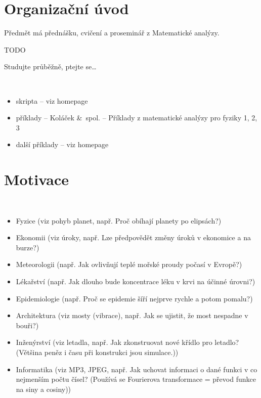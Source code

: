 \documentclass[12pt]{article}					%
\begin{document}
	
\section*{Organizační úvod}
    \begin{poznamka}
        Předmět má přednášku, cvičení a proseminář z Matematické analýzy.
    \end{poznamka}


    \begin{poznamka}[Motivace]
        TODO  
    \end{poznamka}

    \begin{poznamka}
        Studujte průběžně, ptejte se…   
    \end{poznamka}

    \begin{poznamka}[Literatura]
        \ 
        \begin{itemize}
            \item skripta -- viz homepage
            \item příklady -- Koláček \&\ spol. -- Příklady z matematické analýzy pro fyziky 1, 2, 3
            \item další příklady -- viz homepage
        \end{itemize}        
    \end{poznamka}

\section*{Motivace}
    \begin{poznamka}[Používá se v]
        \ 
        \begin{itemize}
            \item Fyzice (viz pohyb planet, např. Proč obíhají planety po elipsách?)
            \item Ekonomii (viz úroky, např. Lze předpovědět změny úroků v ekonomice a na burze?)
            \item Meteorologii (např. Jak ovlivňují teplé mořské proudy počasí v Evropě?)
            \item Lékařství (např. Jak dlouho bude koncentrace léku v krvi na účinné úrovni?)
            \item Epidemiologie (např. Proč se epidemie šíří nejprve rychle a potom pomalu?)
            \item Architektura (viz mosty (vibrace), např. Jak se ujistit, že most nespadne v bouři?)
            \item Inženýrství (viz letadla, např. Jak zkonstruovat nové křídlo pro letadlo? (Většina peněz i času při konstrukci jsou simulace.))
            \item Informatika (viz MP3, JPEG, např. Jak uchovat informaci o dané funkci v co nejmenším počtu čísel? (Používá se Fourierova transformace = převod funkce na siny a cosiny))
        \end{itemize}
    \end{poznamka}
\end{document}
